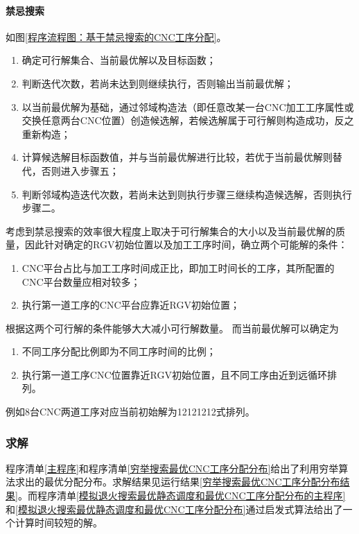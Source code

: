			\paragraph{禁忌搜索}如图\ref{程序流程图：基于禁忌搜索的CNC工序分配}。
			\begin{enumerate}
				\item 确定可行解集合、当前最优解以及目标函数；
				\item 判断迭代次数，若尚未达到则继续执行，否则输出当前最优解；
				\item 以当前最优解为基础，通过邻域构造法（即任意改某一台CNC加工工序属性或交换任意两台CNC位置）创造候选解，若候选解属于可行解则构造成功，反之重新构造；
				\item 计算候选解目标函数值，并与当前最优解进行比较，若优于当前最优解则替代，否则进入步骤五；
				\item 判断邻域构造迭代次数，若尚未达到则执行步骤三继续构造候选解，否则执行步骤二。
			\end{enumerate}
			\par\indent 考虑到禁忌搜索的效率很大程度上取决于可行解集合的大小以及当前最优解的质量，因此针对确定的RGV初始位置以及加工工序时间，确立两个可能解的条件：
			\begin{enumerate}
				\item CNC平台占比与加工工序时间成正比，即加工时间长的工序，其所配置的CNC平台数量应相对较多；
				\item 执行第一道工序的CNC平台应靠近RGV初始位置；
			\end{enumerate}
			\par\indent 根据这两个可行解的条件能够大大减小可行解数量。
			而当前最优解可以确定为
			\begin{enumerate}
				\item 不同工序分配比例即为不同工序时间的比例；
				\item 执行第一道工序CNC位置靠近RGV初始位置，且不同工序由近到远循环排列。
			\end{enumerate}
			\par\indent 例如8台CNC两道工序对应当前初始解为12121212式排列。
		\subsubsection{求解}
			程序清单\ref{主程序}和程序清单\ref{穷举搜索最优CNC工序分配分布}给出了利用穷举算法求出的最优分配分布。求解结果见运行结果\ref{穷举搜索最优CNC工序分配分布结果}。而程序清单\ref{模拟退火搜索最优静态调度和最优CNC工序分配分布的主程序}和\ref{模拟退火搜索最优静态调度和最优CNC工序分配分布}通过启发式算法给出了一个计算时间较短的解。
